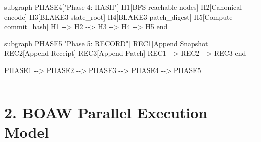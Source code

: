 \documentclass[
]{book}
\newenvironment{Shaded}{}{}
\newcommand{\NormalTok}[1]{#1}
\begin{document}
\begin{Shaded}
\begin{Highlighting}[]
\NormalTok{    subgraph PHASE4["Phase 4: HASH"]}
\NormalTok{        H1[BFS reachable nodes]}
\NormalTok{        H2[Canonical encode]}
\NormalTok{        H3[BLAKE3 state\_root]}
\NormalTok{        H4[BLAKE3 patch\_digest]}
\NormalTok{        H5[Compute commit\_hash]}
\NormalTok{        H1 {-}{-}\textgreater{} H2 {-}{-}\textgreater{} H3 {-}{-}\textgreater{} H4 {-}{-}\textgreater{} H5}
\NormalTok{    end}

\NormalTok{    subgraph PHASE5["Phase 5: RECORD"]}
\NormalTok{        REC1[Append Snapshot]}
\NormalTok{        REC2[Append Receipt]}
\NormalTok{        REC3[Append Patch]}
\NormalTok{        REC1 {-}{-}\textgreater{} REC2 {-}{-}\textgreater{} REC3}
\NormalTok{    end}

\NormalTok{    PHASE1 {-}{-}\textgreater{} PHASE2 {-}{-}\textgreater{} PHASE3 {-}{-}\textgreater{} PHASE4 {-}{-}\textgreater{} PHASE5}
\end{Highlighting}
\end{Shaded}

\begin{center}\rule{0.5\linewidth}{0.5pt}\end{center}

\section{2. BOAW Parallel Execution
Model}\label{boaw-parallel-execution-model}
\end{document}

